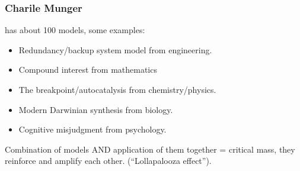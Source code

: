 \begin{frame}[fragile]\frametitle{Charile Munger}

has about 100 models, some examples:

\begin{itemize}
\item Redundancy/backup system model from engineering.
\item Compound interest from mathematics
\item The breakpoint/autocatalysis from chemistry/physics.
\item Modern Darwinian synthesis from biology.
\item Cognitive misjudgment from psychology.
\end{itemize}

Combination of models AND application of them together = critical mass, they reinforce and amplify each other. (“Lollapalooza effect”).

\end{frame}


